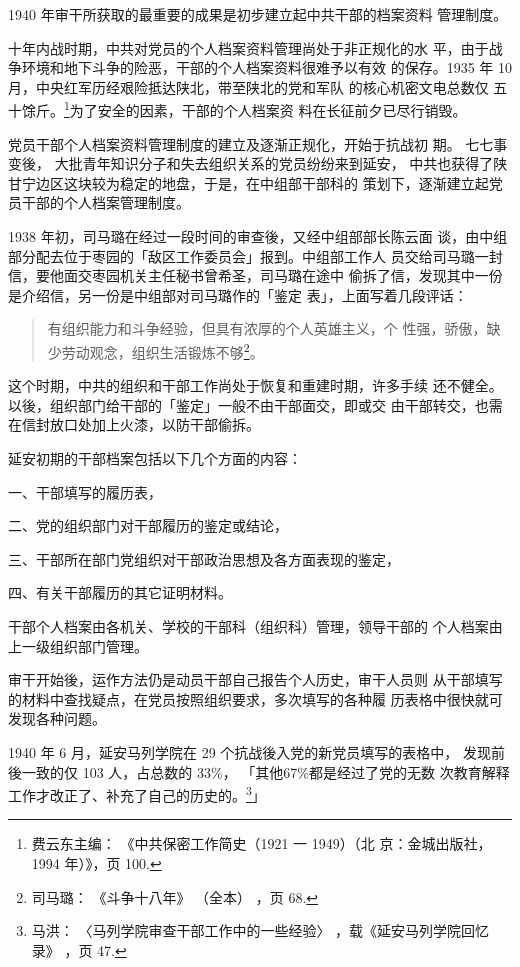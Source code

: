 1940 年审干所获取的最重要的成果是初步建立起中共干部的档案资料
管理制度。

十年内战时期，中共对党员的个人档案资料管理尚处于非正规化的水 平，由于战
争环境和地下斗争的险恶，干部的个人档案资料很难予以有效 的保存。1935 年
10 月，中央红军历经艰险抵达陕北，带至陕北的党和军队 的核心机密文电总数仅
五十馀斤。\footnote{费云东主编： 《中共保密工作简史（1921 一 1949）（北
京：金城出版社，1994 年）》，页 100.}为了安全的因素，干部的个人档案资
料在长征前夕已尽行销毁。

党员干部个人档案资料管理制度的建立及逐渐正规化，开始于抗战初
期。
七七事变後，
大批青年知识分子和失去组织关系的党员纷纷来到延安，
中共也获得了陕甘宁边区这块较为稳定的地盘，于是，在中组部干部科的
策划下，逐渐建立起党员干部的个人档案管理制度。

1938 年初，司马璐在经过一段时间的审查後，又经中组部部长陈云面
谈，由中组部分配去位于枣园的「敌区工作委员会」报到。中组部工作人
员交给司马璐一封信，要他面交枣园机关主任秘书曾希圣，司马璐在途中
偷拆了信，发现其中一份是介绍信，另一份是中组部对司马璐作的「鉴定
表」，上面写着几段评话：
\begin{quote}
{\fzwkai 有组织能力和斗争经验，但具有浓厚的个人英雄主义，个
性强，骄傲，缺少劳动观念，组织生活锻炼不够\footnote{司马璐：
《斗争十八年》
（全本）
，页 68.}。}
\end{quote}
这个时期，中共的组织和干部工作尚处于恢复和重建时期，许多手续
还不健全。以後，组织部门给干部的「鉴定」一般不由干部面交，即或交
由干部转交，也需在信封放口处加上火漆，以防干部偷拆。

延安初期的干部档案包括以下几个方面的内容：

一、干部填写的履历表，

二、党的组织部门对干部履历的鉴定或结论，

三、干部所在部门党组织对干部政治思想及各方面表现的鉴定，

四、有关干部履历的其它证明材料。

干部个人档案由各机关、学校的干部科（组织科）管理，领导干部的
个人档案由上一级组织部门管理。

审干开始後，运作方法仍是动员干部自己报告个人历史，审干人员则
从干部填写的材料中查找疑点，在党员按照组织要求，多次填写的各种履
历表格中很快就可发现各种问题。

1940 年 6 月，延安马列学院在 29 个抗战後入党的新党员填写的表格中，
发现前後一致的仅 103 人，占总数的 33\%，
「其他67\%都是经过了党的无数
次教育解释工作才改正了、补充了自己的历史的。\footnote{马洪：
〈马列学院审查干部工作中的一些经验〉
，载《延安马列学院回忆录》
，页 47.}」

